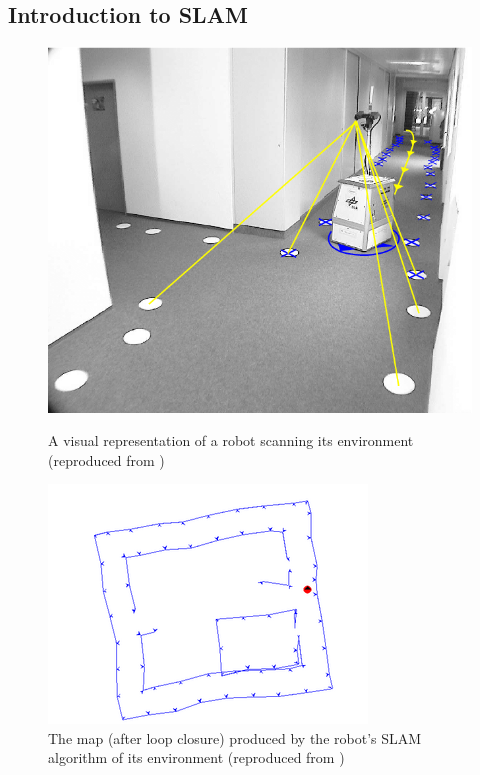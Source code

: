 \documentclass[12pt]{article}
\begin{document}
\subsection{Introduction to SLAM} %

\begin{figure}[h]
    \centering
    \begin{minipage}{0.45\textwidth}
        \centering
        \includegraphics[width=\linewidth]{SLAM_agent} %
        \caption[Short caption]{A visual representation of a robot scanning its environment (reproduced from \cite{SLAM_overview})}
        \label{fig:SLAM_agent}
    \end{minipage}\hfill
    \begin{minipage}{0.45\textwidth}
        \centering
        \includegraphics[width=\linewidth]{SLAM_map} %
        \caption[Short caption]{The map (after loop closure) produced by the robot's SLAM algorithm of its environment (reproduced from \cite{SLAM_overview})}
        \label{fig:SLAM_map}
    \end{minipage}
\end{figure}
\end{document}
